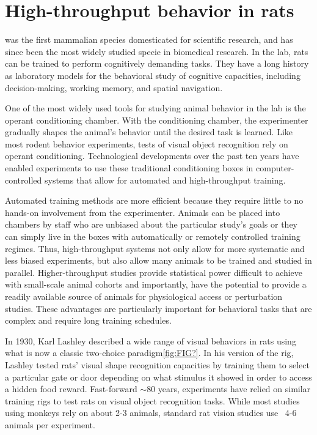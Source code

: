 
\chapter{High-throughput behavior in rats}
 was the first mammalian species domesticated for scientific research\cite{Jacob199}, and has since been the most widely studied specie in biomedical research. In the lab, rats can be trained to perform cognitively demanding tasks. They have a long history as laboratory models for the behavioral study of cognitive capacities, including decision-making\cite{Brunton2013, Raposo2012, Miller2017TwoStep, Piet2018RatsEnvironment}, working memory\cite{Bratch2016}, and spatial navigation\cite{OKeefe1971, Whishaw1995, Aronov2014}. 

One of the most widely used tools for studying animal behavior in the lab is the operant conditioning chamber. With the conditioning chamber, the experimenter gradually shapes the animal's behavior until the desired task is learned. Like most rodent behavior experiments, tests of visual object recognition rely on operant conditioning. Technological developments over the past ten years have enabled experiments to use these traditional conditioning boxes in computer-controlled systems that allow for automated and high-throughput training. 

Automated training methods are more efficient because they require little to no hands-on involvement from the experimenter. Animals can be placed into chambers by staff who are unbiased about the particular study's goals or they can simply live in the boxes with automatically or remotely controlled training regimes\cite{Qiao2018, Poddar2013, Miller2017Twostep}. Thus, high-throughput systems not only allow for more systematic and less biased experiments, but also allow many animals to be trained and studied in parallel. Higher-throughput studies provide statistical power difficult to achieve with small-scale animal cohorts and importantly, have the potential to provide a readily available source of animals for physiological access or perturbation studies. These advantages are particularly important for behavioral tasks that are complex and require long training schedules.

In 1930, Karl Lashley\cite{Lashley1930} described a wide range of visual behaviors in rats using what is now a classic two-choice paradigm\ref{fig:FIG?}. In his version of the rig, Lashley tested rats' visual shape recognition capacities by training them to select a particular gate or door depending on what stimulus it showed in order to access a hidden food reward. Fast-forward $\sim$80 years, experiments have relied on similar training rigs to test rats on visual object recognition tasks\cite{Zoccolan2009, ETC}. While most studies using monkeys rely on about 2-3 animals, standard rat vision studies use ~4-6 animals per experiment\cite{Vermaercke2012, Tafazoli2012Transformation-TolerantPriming}.


